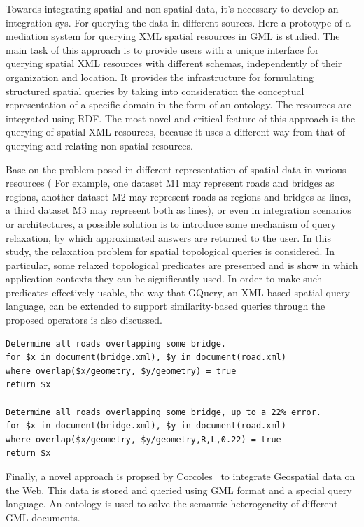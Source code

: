 \documentclass[a4paper,12pt]{article}
\begin{document}
\cite{corcoles2004} Towards integrating spatial and non-spatial data, it's necessary to develop an integration sys. For querying the data in different sources. Here a prototype of a mediation system for querying XML spatial resources in GML is studied.  The main task of this approach is to provide users with a unique interface for querying spatial XML resources with different schemas, independently of their organization and location. It provides the infrastructure for formulating structured spatial queries by taking into consideration the conceptual representation of a specific domain in the form of an ontology. The resources are integrated using RDF. The most novel and critical feature of this approach is the querying of spatial XML resources, because it uses a different way from that of querying and relating non-spatial resources.

\cite{belussi2006} Base on the problem posed in different representation of spatial data in various resources ( For example, one dataset M1 may represent roads and bridges as regions, another dataset M2 may represent roads as regions and bridges as lines, a third dataset M3 may represent both as lines), or even in integration scenarios or architectures, a possible solution is to introduce some mechanism of query relaxation, by which approximated answers are returned to the user. In this study, the relaxation problem for spatial topological queries is considered. In particular,  some relaxed topological predicates are presented and is show in which application contexts they can be significantly used. In order to make such predicates effectively usable, the way that GQuery, an XML-based spatial query language, can be extended to support similarity-based queries through the proposed operators is also discussed.

\begin{verbatim}
Determine all roads overlapping some bridge.
for $x in document(bridge.xml), $y in document(road.xml)
where overlap($x/geometry, $y/geometry) = true
return $x

Determine all roads overlapping some bridge, up to a 22% error.
for $x in document(bridge.xml), $y in document(road.xml)
where overlap($x/geometry, $y/geometry,R,L,0.22) = true
return $x 
\end{verbatim}

Finally, a novel approach is propsed by Corcoles~\cite{corcoles2003} to integrate Geospatial data on the Web.
This data is stored and queried using GML format and a special query language. 
An ontology is used to solve the semantic heterogeneity of different GML documents.
\end{document}

